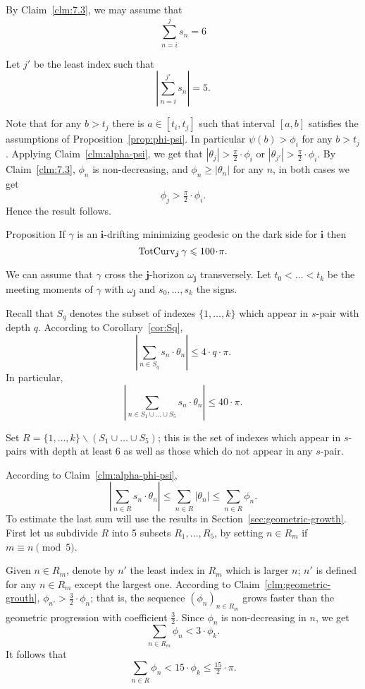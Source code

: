 \documentclass[a4paper,10pt]{amsart}
\begin{document}
By Claim~\ref{clm:7.3}, we may assume that 
\[\sum_{n=i}^{j}s_n= 6\]

Let $j'$ be the least index 
such that
\[|\sum_{n=i}^{j'} s_n|=5.\]

Note that for any $b>t_j$ there is $a\in[t_i,t_j]$
such that interval $[a,b]$ satisfies the assumptions of Proposition~\ref{prop:phi-psi}.
In particular $\psi(b)>\phi_i$ for any $b>t_j$.
Applying Claim~\ref{clm:alpha-psi},
we get that $|\theta_j|>\tfrac\pi2\cdot \phi_i$ or 
$|\theta_{j'}|>\tfrac\pi2\cdot \phi_i$.
By Claim~\ref{clm:7.3}, $\phi_n$ is non-decreasing,
and $\phi_n\ge |\theta_n|$ for any $n$,
in both cases we get
\[\phi_j>\tfrac\pi2\cdot \phi_i.\]
Hence the result follows.
\qeds



\begin{thm}{Proposition}\label{prop:graph}
If $\gamma$ is an $\bm{i}$-drifting minimizing geodesic on the dark side for $\bm{i}$ then
\[\tc_{\bm{j}}\gamma\le 100\cdot\pi.\]
\end{thm}

We can assume that
$\gamma$ cross the $\bm{j}$-horizon $\omega_{\bm{j}}$ transversely.
Let $t_0<\dots<t_k$ be the meeting moments of $\gamma$ with $\omega_{\bm{j}}$ and
$s_0,\dots,s_k$ the signs.

Recall that $S_q$ denotes the subset of indexes $\{1,\dots,k\}$
which appear in $s$-pair with depth $q$.
According to Corollary~\ref{cor:Sq},
\[\left|\sum_{n\in S_q}s_n\cdot\theta_n\right|\le 4\cdot q\cdot \pi.\]
In particular,
\[\left|\sum_{n\in S_1\cup\dots\cup S_5}
s_n\cdot\theta_n\right|
\le 
40\cdot\pi.\]

Set $R=\{1,\dots,k\}\backslash (S_1\cup\dots\cup S_5)$;
this is the set of indexes which appear in $s$-pairs with depth at least $6$ 
as well as those which do not appear in any $s$-pair.

According to Claim~\ref{clm:alpha-phi-psi},
\[\left|\sum_{n\in R}
s_n\cdot\theta_n\right|
\le
\sum_{n\in R}
|\theta_n|\le \sum_{n\in R}\phi_n.\] 
To estimate the last sum will use the results in Section~\ref{sec:geometric-growth}.
First let us subdivide $R$ into 5 subsets $R_1,\dots,R_5$,
by setting 
$n\in R_m$ if $m\equiv n\pmod 5$.

Given $n\in R_m$, denote by $n'$ the least index in $R_m$ which is larger $n$;
$n'$ is defined for any $n\in R_m$ except the largest one.
According to Claim~\ref{clm:geometric-grouth}, 
$\phi_{n'}>\tfrac32\cdot \phi_n$;
that is, the sequence $(\phi_n)_{n\in R_m}$ grows faster than the geometric progression with coefficient $\tfrac32$.
Since $\phi_n$ is non-decreasing in $n$,
we get 
\[\sum_{n\in R_m}\phi_n< 3\cdot\phi_k.\]
It follows that 
\[\sum_{n\in R}\phi_n< 15\cdot\phi_k\le\tfrac{15}2\cdot\pi.\]
\end{document}
